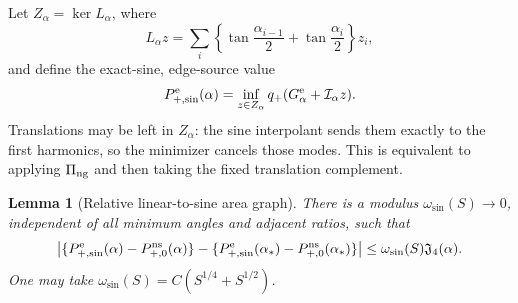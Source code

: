 \documentclass[11pt]{amsart}
\numberwithin{equation}{section}
\newtheorem{lemma}[theorem]{Lemma}
\theoremstyle{definition}
\theoremstyle{remark}
\newcommand{\Jfour}{\mathfrak J_4}
\begin{document}
Let $Z_\alpha=\ker L_\alpha$, where
\begin{equation}\label{JP:eq:normal-exact-area-row}
 L_\alpha z=\sum_i\left\{
 \tan\frac{\alpha_{i-1}}2+\tan\frac{\alpha_i}2\right\}z_i,
\end{equation}
and define the exact-sine, edge-source value
\begin{equation}\label{JP:eq:P-plus-normal-sine}
 P_{+,\sin}^{\rm e}(\alpha)
 =\inf_{z\in Z_\alpha}
 q_+(G_\alpha^{\rm e}+\mathcal I_\alpha z).
\end{equation}
Translations may be left in $Z_\alpha$: the sine interpolant sends them
exactly to the first harmonics, so the minimizer cancels those modes.  This
is equivalent to applying $\Pi_{\rm ng}$ and then taking the fixed
translation complement.

\begin{lemma}[Relative linear-to-sine area graph]
\label{JP:lem:normal-sine-graph}
There is a modulus $\omega_{\sin}(S)\to0$, independent of all minimum
angles and adjacent ratios, such that
\begin{equation}\label{JP:eq:normal-sine-relative}
 \left|\{P_{+,\sin}^{\rm e}(\alpha)-P_{+,0}^{\rm ns}(\alpha)\}
 -\{P_{+,\sin}^{\rm e}(\alpha_*)-P_{+,0}^{\rm ns}(\alpha_*)\}\right|
 \le\omega_{\sin}(S)\Jfour(\alpha).
\end{equation}
One may take $\omega_{\sin}(S)=C(S^{1/4}+S^{1/2})$.
\end{lemma}
\end{document}
